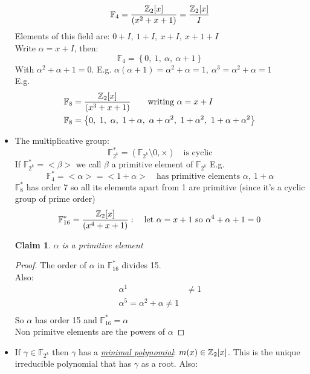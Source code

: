 \documentclass[]{article}
\newtheorem*{clm}{Claim}
\theoremstyle{definition}
\theoremstyle{remark}
\numberwithin{equation}{section}
\begin{document}
\begin{itemize}
					\[
						\mathbb{F}_4 = \frac{\mathbb{Z}_2[x]}{(x^2+x+1)} = \frac{\mathbb{Z}_2[x]}{I}
					\]
					Elements of this field are: $0 + I,\ 1+I,\ x+I,\ x+1+I$\\
					Write $\alpha = x+I$, then:
					\[
						\mathbb{F}_4 = \left\{0,\ 1,\ \alpha,\ \alpha+1\right\}
					\]
					With $\alpha^2+\alpha + 1 = 0$. E.g. $\alpha(\alpha+1) = \alpha^2+\alpha = 1,\ \alpha^3 = \alpha^2 + \alpha = 1$
					\\
					E.g.
					\begin{align*}
						\mathbb{F}_8 &= \frac{\ZZb[x]}{(x^3+x+1)}\qquad \text{writing $\alpha = x+I$}\\
						\mathbb{F}_8 &= \left\{0,\ 1,\ \alpha,\ 1+\alpha,\ \alpha+\alpha^2,\ 1+\alpha^2,\ 1+\alpha + \alpha^2 \right\}
					\end{align*}
					\item The multiplicative group:
					\[
						\mathbb{F}_{2^k}^* = (\mathbb{F}_{2^k}\setminus 0, \times) \quad \text{is cyclic}
					\]
					If $\mathbb{F}_{2^k}^* = <\beta>$ we call $\beta$ a primitive element of $\mathbb{F}_{2^k}$
					E.g.\\
					\[
						\mathbb{F}_4^* = <\alpha> = <1+\alpha> \quad \text{has primitive elements $\alpha,\ 1+\alpha$}
					\]
					$\mathbb{F}_8^*$ has order 7 so all its elements apart from 1 are primitive (since it's a cyclic group of prime order)
					\[
						\mathbb{F}_{16}^* = \frac{\mathbb{Z}_2[x]}{(x^4+x+1)}: \quad \text{let $\alpha = x +1$ so $\alpha^4+\alpha+1 = 0$}
					\]
					\begin{clm} $\alpha$ is a primitive element
					\end{clm}
					\begin{proof}
						The order of $\alpha$ in $\mathbb{F}_{16}^*$ divides 15.\\
						Also:
						\begin{align*}
							\alpha^1 &\neq 1\\
							\alpha^5 = \alpha^2 + \alpha \neq 1\\
						\end{align*}
						So $\alpha$ has order 15 and $\mathbb{F}_{16}^* = \alpha$\\
						Non primitve elements are the powers of $\alpha$
					\end{proof}
					\item If $\gamma \in \mathbb{F}_{2^k}$ then $\gamma$ has a \emph{\underline{minimal polynomial}}: $m(x) \in \mathbb{Z}_2[x]$. This is the unique irreducible polynomial that has $\gamma$ as a root. Also:
					\begin{align*}

\end{align*}
\end{itemize}
\end{document}
